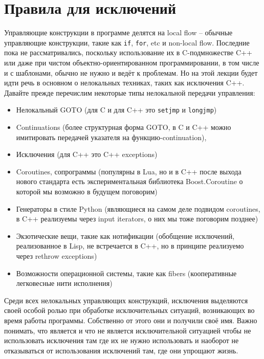 \documentclass[a4paper,12pt,oneside]{article}
\begin{document}
\pagebreak
\section{Правила для исключений}

Управляющие конструкции в программе делятся на local flow -- обычные управляющие конструкции, такие как \lstinline!if!, \lstinline!for!, etc и non-local flow. Последние пока не рассматривались, поскольку использование их в C-подмножестве C++ или даже при чистом объектно-ориентированном программировании, в том числе и с шаблонами, обычно не нужно и ведёт к проблемам. Но на этой лекции будет идти речь в основном о нелокальных техниках, таких как исключения C++. Давайте прежде перечислим некоторые типы нелокальной передачи управления:

\begin{itemize}
\item
Нелокальный GOTO (для C и для C++ это \lstinline!setjmp! и \lstinline!longjmp!)
\item
Continuations (более структурная форма GOTO, в C и C++ можно имитировать передачей указателя на функцию-continuation), 
\item
Исключения (для C++ это C++ exceptions)
\item
Coroutines, сопрограммы (популярны в Lua, но и в C++ после выхода нового стандарта есть экспериментальная библиотека Boost.Coroutine о которой мы возможно в будущем поговорим)
\item
Генераторы в стиле Python (являющиеся на самом деле подвидом coroutines, в C++ реализуемы через input iterators, о них мы тоже поговорим позднее)
\item
Экзотические вещи, такие как нотификации (обобщение исключений, реализованное в Lisp, не встречается в C++, но в принципе реализуемо через rethrow exceptions)
\item
Возможности операционной системы, такие как fibers (кооперативные легковесные нити исполнения)
\end{itemize}

Среди всех нелокальных управляющих конструкций, исключения выделяются своей особой ролью при обработке исключительных ситуаций, возникающих во время работы программы. Собственно от этого они и получили своё имя. Важно понимать, что является и что не является исключительной ситуацией чтобы не использовать исключения там где их не нужно использовать и наоборот не отказываться от использования исключений там, где они упрощают жизнь.
\end{document}
